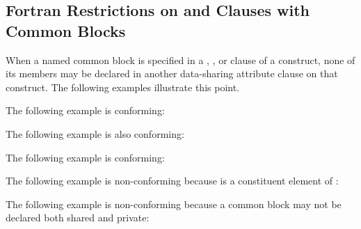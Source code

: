 \pagebreak
\begin{fortranspecific}[4ex]
\section{Fortran Restrictions on  and  Clauses with Common Blocks}
\label{sec:fort_sp_common}

When a named common block is specified in a , , 
or  clause of a construct, none of its members may be declared 
in another data-sharing attribute clause on that construct. The following examples 
illustrate this point. 

The following example is conforming:

{}

The following example is also conforming:


The following example is conforming:


The following example is non-conforming because  is a constituent element 
of :


The following example is non-conforming because a common block may not be declared 
both shared and private:

\end{fortranspecific}


